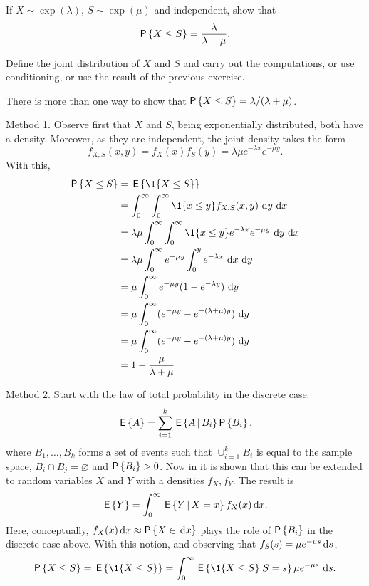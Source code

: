 \begin{exercise}\label{ex:3}
   If $X\sim \exp(\lambda)$, $S\sim\exp(\mu)$ and independent, show that 
    \begin{equation*}
      \P{X\leq S} = \frac{\lambda}{\lambda+\mu}.
    \end{equation*}
    \begin{hint}
     Define the joint distribution of $X$ and $S$ and carry out
      the computations, or use conditioning, or use the result of the
      previous exercise.
    \end{hint}
\begin{solution}
There is more than one way to show that $\P{X\leq S} = \lambda/(\lambda+\mu)$.  

Method 1. Observe first that $X$ and $S$, being
exponentially distributed, both have a density. Moreover, as they are
independent,  the joint density takes the form
\begin{equation*}
f_{X,S}(x,y) = f_X(x)f_S(y) = \lambda \mu e^{-\lambda x} e^{-\mu
  y}.
\end{equation*}
With this,
\begin{equation*}
  \begin{split}
    \P{X\leq S} 
&= \E{\1{X\leq S}} \\
&= \int_0^\infty \int_0^\infty \1{x\leq y} f_{X,S}(x,y)\, \d y\,\d x\\
&= \lambda \mu \int_0^\infty \int_0^\infty \1{x\leq y} e^{-\lambda x} e^{-\mu y} \, \d y\,\d x\\
&= \lambda \mu \int_0^\infty e^{-\mu y} \int_0^y e^{-\lambda x}\, \d x \, \d y \\
&= \mu \int_0^\infty e^{-\mu y} (1-e^{-\lambda y})\,\d y\\
&= \mu \int_0^\infty (e^{-\mu y} - e^{-(\lambda +\mu)y} ) \,\d y\\
&= \mu \int_0^\infty (e^{-\mu y} - e^{-(\lambda +\mu)y} ) \,\d y\\
&= 1 - \frac{\mu}{\lambda + \mu} 
  \end{split}
\end{equation*}

Method 2. Start with  the law of total probability in the discrete case: 
\begin{equation*}
  \E{A} = \sum_{i=1}^k \E{A\given B_i} \P{B_i},
\end{equation*}
where $B_1,\ldots, B_k$ forms a set of events such that $\cup_{i=1}^k B_i$ is equal to the sample space, $B_i\cap B_j = \varnothing$ and $\P{B_i}>0$. Now in \cite{capinski03:_probab_probl} it is shown that this can be extended to random variables $X$ and $Y$ with a densities $f_X, f_Y$. The result is
\begin{equation*}
  \,\mathsf{E}\left\{Y\right\} = \int_0^\infty \,\mathsf{E}\left\{Y\,\middle|\, X=x\right\} f_X(x)\,\text{d}x.
\end{equation*}
Here, conceptually, $f_X(x)\d x \approx \P{X\in \d x}$ plays the role of $\P{B_i}$ in the discrete case above. With this notion, and observing that $f_S(s) = \mu e^{-\mu s} \,\text{d}s$,
\begin{equation*}
\P{X\leq S} = \E{\1{X\leq S}} = \int_0^\infty \E{\1{X\leq S}| S=s} \mu e^{-\mu s} \,  \d s.
\end{equation*}


\end{solution}
\end{exercise}
